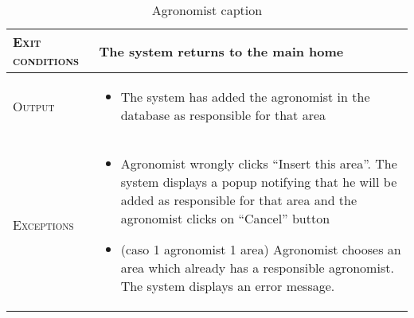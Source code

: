 \begin{table}[H]
\begin{tabular}[c]{|l|p{}|}
        \textsc{Exit conditions}    &  The system returns to the main home\\
    	\hline %
    	\textsc{Output}             &  \begin{itemize}
    	    \item The system has added the agronomist in the database as responsible for that area
    	\end{itemize}\\
    	\hline %
    	\textsc{Exceptions}         &  \begin{itemize}
    	    \item Agronomist wrongly clicks “Insert this area”. The system displays a popup notifying that he will be added as responsible for that area and the agronomist clicks on “Cancel” button
    	    \item (caso 1 agronomist 1 area) Agronomist chooses an area which already has a responsible agronomist. The system displays an error message.
    	\end{itemize}\\
    	\hline %
        
    \end{tabular}
    \caption{\label{tab:responsible_area_insertion}Agronomist caption }
\end{table}


